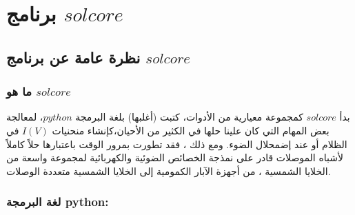 
\chapter{برنامج $ solcore $}

\label{Chapter2} 





\section*{نظرة عامة عن برنامج $ solcore $}

\subsection{ما هو $ solcore $}
بدأ $ solcore $ كمجموعة معيارية من الأدوات، كتبت (أغلبها) بلغة البرمجة $ python $، لمعالجة بعض المهام التي كان علينا حلها في الكثير من الأحيان،كإنشاء منحنيات $ I(V) $ في الظلام أو عند إضمحلال الضوء. ومع ذلك ، فقد تطورت بمرور الوقت باعتبارها حلاً كاملاً لأشباه الموصلات قادر على نمذجة الخصائص الضوئية والكهربائية لمجموعة واسعة من الخلايا الشمسية ، من أجهزة الآبار الكمومية إلى الخلايا الشمسية متعددة الوصلات.
\subsection{لغة البرمجة python:}





